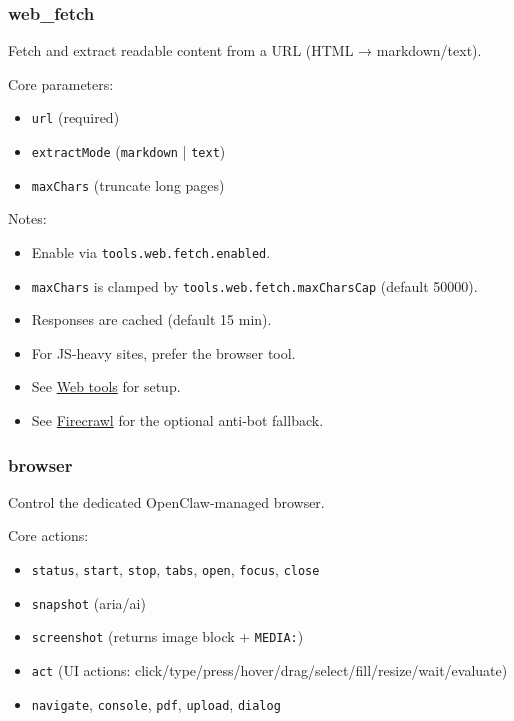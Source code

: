\subsubsection{web\_fetch}


Fetch and extract readable content from a URL (HTML → markdown/text).

Core parameters:

\begin{itemize}
  \item \texttt{url} (required)
  \item \texttt{extractMode} (\texttt{markdown} | \texttt{text})
  \item \texttt{maxChars} (truncate long pages)
\end{itemize}


Notes:

\begin{itemize}
  \item Enable via \texttt{tools.web.fetch.enabled}.
  \item \texttt{maxChars} is clamped by \texttt{tools.web.fetch.maxCharsCap} (default 50000).
  \item Responses are cached (default 15 min).
  \item For JS-heavy sites, prefer the browser tool.
  \item See \href{/tools/web}{Web tools} for setup.
  \item See \href{/tools/firecrawl}{Firecrawl} for the optional anti-bot fallback.
\end{itemize}


\subsubsection{browser}


Control the dedicated OpenClaw-managed browser.

Core actions:

\begin{itemize}
  \item \texttt{status}, \texttt{start}, \texttt{stop}, \texttt{tabs}, \texttt{open}, \texttt{focus}, \texttt{close}
  \item \texttt{snapshot} (aria/ai)
  \item \texttt{screenshot} (returns image block + \texttt{MEDIA:})
  \item \texttt{act} (UI actions: click/type/press/hover/drag/select/fill/resize/wait/evaluate)
  \item \texttt{navigate}, \texttt{console}, \texttt{pdf}, \texttt{upload}, \texttt{dialog}
\end{itemize}


